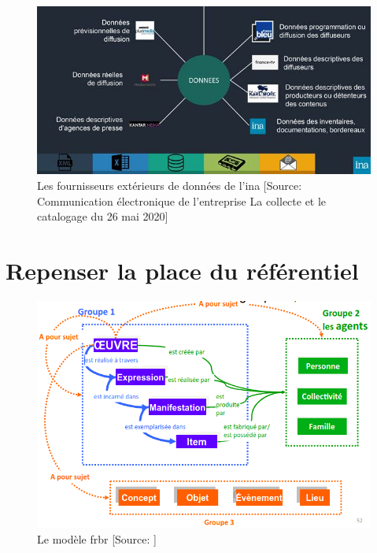 \begin{figure}[!h]
	\centering
	\includegraphics[width=16cm]{images/enrichissement_dl.jpg}
	\caption[Les fournisseurs extérieurs de données de l'\ac{ina}]{Les fournisseurs extérieurs de données de l'\ac{ina} [Source: Communication électronique  de l'entreprise \og La collecte et le catalogage\fg{} du 26 mai 2020]}
	\label{enrichissement_dl}
\end{figure}



\chapter{\label{annexe_nvx_modeles}Repenser la place du référentiel}

\begin{figure}[!h]
	\centering
	\includegraphics[width=16cm]{images/frbr_slide.png}
	\caption[Le modèle \ac{frbr}]{Le modèle \ac{frbr} [Source: \cite[s.52]{benezet_participer_2015}]}
	\label{frbr}
\end{figure}

